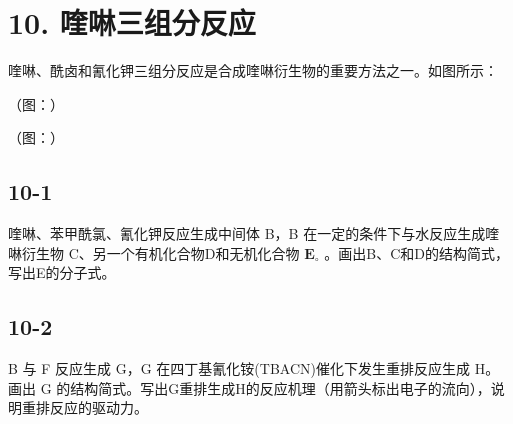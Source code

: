 \section*{10. 喹啉三组分反应}
喹啉、酰⻧和氰化钾三组分反应是合成喹啉衍⽣物的重要⽅法之⼀。如图所⽰：

（图：）

（图：）

\subsection*{10-1}
喹啉、苯甲酰氯、氰化钾反应⽣成中间体 B，B 在⼀定的条件下与⽔反应⽣成喹啉衍⽣物 C、另⼀个有机化合物D和⽆机化合物 $\mathbf { E } _ { \circ }$ 。画出B、C和D的结构简式，写出E的分⼦式。

\subsection*{10-2}
B 与 F 反应⽣成 G，G 在四丁基氰化铵(TBACN)催化下发⽣重排反应⽣成 H。画出 G 的结构简式。写出G重排⽣成H的反应机理（⽤箭头标出电⼦的流向），说明重排反应的驱动⼒。
